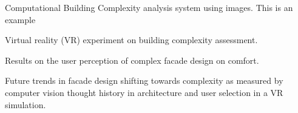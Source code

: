 
\item Computational Building Complexity analysis system using images. This is an example
\item Virtual reality (VR) experiment on building complexity assessment.
\item Results on the user perception of complex facade design on comfort.
\item Future trends in facade design shifting towards complexity as measured by computer vision thought history in architecture and user selection in a VR simulation.

